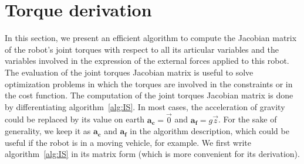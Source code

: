 


\section{Torque derivation}
\label{sec:torque_derivation}


In this section, we present an efficient algorithm to compute the Jacobian matrix of the robot's joint torques with respect to all its articular variables and the variables involved in the expression of the external forces applied to this robot.
The evaluation of the joint torques Jacobian matrix is useful to solve optimization problems in which the torques are involved in the constraints or in the cost function.
The computation of the joint torques Jacobian matrix is done by differentiating algorithm~\ref{alg:IS}.
In most cases, the acceleration of gravity could be replaced by its value on earth $\mathbf{a_c} = \vec{0}$ and $\mathbf{a_f} = g \vec{z}$.
For the sake of generality, we keep it as $\mathbf{a_c}$ and $\mathbf{a_f}$ in the algorithm description, which could be useful if the robot is in a moving vehicle, for example.
We first write algorithm~\ref{alg:IS} in its matrix form (which is more convenient for its derivation).

